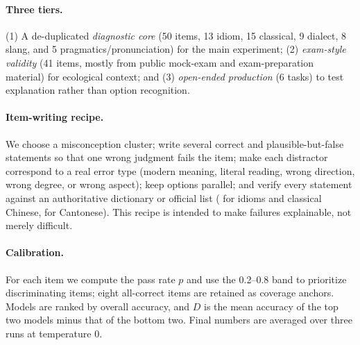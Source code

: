 \documentclass[11pt]{article}
\begin{document}
\paragraph{Three tiers.}
(1) A de-duplicated \emph{diagnostic core} (50 items, 13 idiom, 15 classical, 9 dialect, 8 slang, and 5 pragmatics/pronunciation) for the main experiment; (2) \emph{exam-style validity} (41 items, mostly from public mock-exam and exam-preparation material) for ecological context; and (3) \emph{open-ended production} (6 tasks) to test explanation rather than option recognition.

\paragraph{Item-writing recipe.} We choose a misconception cluster; write several correct and plausible-but-false statements so that one wrong judgment fails the item; make each distractor correspond to a real error type (modern meaning, literal reading, wrong direction, wrong degree, or wrong aspect); keep options parallel; and verify every statement against an authoritative dictionary or official list (\citealp{zdic} for idioms and classical Chinese, \citealp{wordshk} for Cantonese). This recipe is intended to make failures explainable, not merely difficult.

\begin{table}[t]
\centering
\small
{}
\caption{Representative failure explanations exposed by the same review workflow.}
\label{tab:examples}
\end{table}

\paragraph{Calibration.} For each item we compute the pass rate $p$ and use the 0.2--0.8 band to prioritize discriminating items; eight all-correct items are retained as coverage anchors. Models are ranked by overall accuracy, and $D$ is the mean accuracy of the top two models minus that of the bottom two. Final numbers are averaged over three runs at temperature 0.
\end{document}
